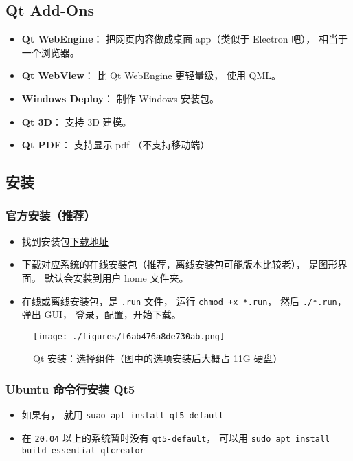 \subsection{Qt Add-Ons}
\begin{itemize}
\item \textbf{Qt WebEngine}： 把网页内容做成桌面 app（类似于 Electron 吧）， 相当于一个浏览器。
\item \textbf{Qt WebView}： 比 Qt WebEngine 更轻量级， 使用 QML。
\item \textbf{Windows Deploy}： 制作 Windows 安装包。
\item \textbf{Qt 3D}： 支持 3D 建模。
\item \textbf{Qt PDF}： 支持显示 pdf （不支持移动端）
\end{itemize}


\subsection{安装}
\subsubsection{官方安装（推荐）}
\begin{itemize}
\item 找到安装包\href{https://www.qt.io/download-qt-installer}{下载地址}
\item 下载对应系统的在线安装包（推荐，离线安装包可能版本比较老）， 是图形界面。 默认会安装到用户 home 文件夹。
\item 在线或离线安装包，是 \verb|.run| 文件， 运行 \verb|chmod +x *.run|， 然后 \verb|./*.run|， 弹出 GUI， 登录，配置，开始下载。
\end{itemize}

\begin{figure}[ht]
\centering
\texttt{[image: ./figures/f6ab476a8de730ab.png]}
\caption{Qt 安装：选择组件（图中的选项安装后大概占 11G 硬盘）} \label{fig_QtInt_3}
\end{figure}



\subsubsection{Ubuntu 命令行安装 Qt5}
\begin{itemize}
\item 如果有， 就用 \verb|suao apt install qt5-default|
\item 在 \verb|20.04| 以上的系统暂时没有 \verb|qt5-default|， 可以用 \verb|sudo apt install build-essential qtcreator|
\end{itemize}


